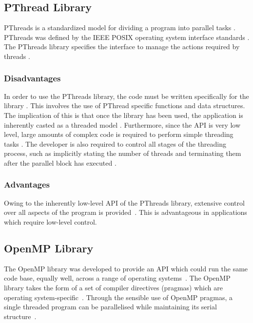 \documentclass[10pt,twocolumn]{witseiepaper}
\begin{document}
\subsection{PThread Library}
PThreads is a standardized model for dividing a program into parallel tasks \cite{pthreads}. PThreads was defined by the IEEE POSIX operating system interface standards \cite{pthreads}. The PThreads library specifies the interface to manage the actions required by threads \cite{pthreadVSopen}.

\subsubsection{Disadvantages}
In order to use the PThreads library, the code must be written specifically for the library \cite{pthreadVSopen}. This involves the use of PThread specific functions and data structures. The implication of this is that once the library has been used, the application is inherently casted as a threaded model \cite{pthreadVSopen}. Furthermore, since the API is very low level, large amounts of complex code is required to perform simple threading tasks \cite{pthreadVSopen}. The developer is also required to control all stages of the threading process, such as implicitly stating the number of threads and terminating them after the parallel block has executed \cite{pthreadVSopen}.

\subsubsection{Advantages}
Owing to the inherently low-level API of the PThreads library, extensive control over all aspects of the program is provided~\cite{pthreadVSopen}. This is advantageous in applications which require low-level control.

\subsection{OpenMP Library}
The OpenMP library was developed to provide an API which could run the same code base, equally well, across a range of operating systems~\cite{pthreadVSopen}. The OpenMP library takes the form of a set of compiler directives (pragmas) which are operating system-specific~\cite{pthreadVSopen}. Through the sensible use of OpenMP pragmas, a single threaded program can be parallelised while maintaining its serial structure~\cite{kuhn2000openmp,pthreadVSopen}.
\end{document}
